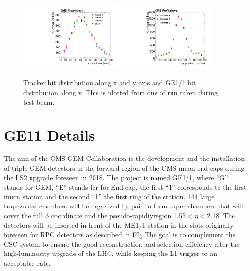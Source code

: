 \begin{figure}[!htbp]
\centering
\includegraphics[width=0.45\textwidth]{figures/GEM/Tracker_Hit_position_Run1644_x.pdf}%
\includegraphics[width=0.45\textwidth]{figures/GEM/Tracker_Hit_position_Run1644_y.pdf}
\caption{Tracker hit distribution along x and y axis and GE1/1 hit distribution along y. This is plotted from one of run taken during test-beam.}
\label{HitPosXaxis}
\end{figure}





\section{GE11 Details}
The aim of the CMS GEM Collaboration is the development and the installation of triple-GEM detectors in the forward region of the CMS muon end-caps during the LS2 upgrade foreseen in 2018. The project is named GE1/1, where ``G'' stands for GEM, ``E'' stands for for End-cap, the first ``1'' corresponds to the first muon station and the second ``1'' the first ring of the station. 144 large trapezoidal chambers will be organized by pair to form super-chambers that will cover the full $\phi$ coordinate and the pseudo-rapidiyregion 1.55$ < \eta < $2.18. The detectors will be inserted in front of the ME1/1 station in the slots originally foreseen for RPC detectors as described in FIg%
The goal is to complement the CSC system to ensure the good reconstruction and selection efficiency after the high-luminosity upgrade of the LHC, while keeping the L1 trigger to an acceptable rate. 

